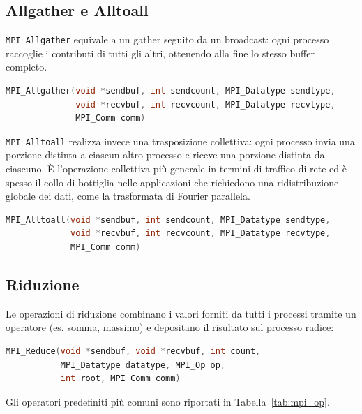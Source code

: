 \subsection{Allgather e Alltoall}
\texttt{MPI\_Allgather} equivale a un gather seguito da un broadcast: ogni processo raccoglie i contributi di tutti gli altri, ottenendo alla fine lo stesso buffer completo.
\begin{lstlisting}[language=C, numbers=none]
MPI_Allgather(void *sendbuf, int sendcount, MPI_Datatype sendtype,
              void *recvbuf, int recvcount, MPI_Datatype recvtype,
              MPI_Comm comm)
\end{lstlisting}

\texttt{MPI\_Alltoall} realizza invece una trasposizione collettiva: ogni processo invia una porzione distinta a ciascun altro processo e riceve una porzione distinta da ciascuno. È l'operazione collettiva più generale in termini di traffico di rete ed è spesso il collo di bottiglia nelle applicazioni che richiedono una ridistribuzione globale dei dati, come la trasformata di Fourier parallela.
\begin{lstlisting}[language=C, numbers=none]
MPI_Alltoall(void *sendbuf, int sendcount, MPI_Datatype sendtype,
             void *recvbuf, int recvcount, MPI_Datatype recvtype,
             MPI_Comm comm)
\end{lstlisting}

\subsection{Riduzione}
Le operazioni di riduzione combinano i valori forniti da tutti i processi tramite un operatore (es. somma, massimo) e depositano il risultato sul processo radice:
\begin{lstlisting}[language=C, numbers=none]
MPI_Reduce(void *sendbuf, void *recvbuf, int count,
           MPI_Datatype datatype, MPI_Op op,
           int root, MPI_Comm comm)
\end{lstlisting}
Gli operatori predefiniti più comuni sono riportati in Tabella~\ref{tab:mpi_op}.

